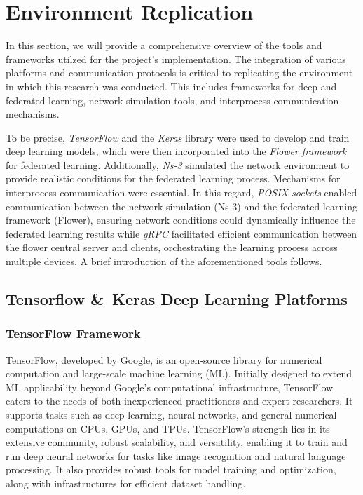 
\chapter{Environment Replication}
In this section, we will provide a comprehensive overview of the tools and frameworks utilzed for the project's implementation.
The integration of various platforms and communication protocols is critical to replicating the environment in which this research
was conducted. This includes frameworks for deep and federated learning, network simulation tools, and interprocess communication
mechanisms.

To be precise, \emph{TensorFlow} and the \emph{Keras} library were used to develop and train deep learning models, which were then incorporated
into the \emph{Flower framework} for federated learning. Additionally, \emph{Ns-3} simulated the network environment to provide realistic conditions
for the federated learning process. Mechanisms for interprocess communication were essential. In this regard, \emph{POSIX sockets} enabled communication
between the network simulation (Ns-3) and the federated learning framework (Flower), ensuring network conditions could dynamically influence the federated
learning results while \emph{gRPC} facilitated efficient communication between the flower central server and clients, orchestrating the
learning process across multiple devices. A brief introduction of the aforementioned tools follows.

\section{Tensorflow \&\ Keras Deep Learning Platforms}
\label{sec:deep_frameworks}
\subsection{TensorFlow Framework}
\href{https://www.tensorflow.org/}{TensorFlow}, developed by Google, is an open-source library for numerical computation and large-scale machine learning (ML). Initially designed to extend ML applicability beyond Google's computational infrastructure, TensorFlow caters to the needs of both inexperienced practitioners and expert researchers. It supports tasks such as deep learning, neural networks, and general numerical computations on CPUs, GPUs, and TPUs. TensorFlow's strength lies in its extensive community, robust scalability, and versatility, enabling it to train and run deep neural networks for tasks like image recognition and natural language processing. It also provides robust tools for model training and optimization, along with infrastructures for efficient dataset handling.

